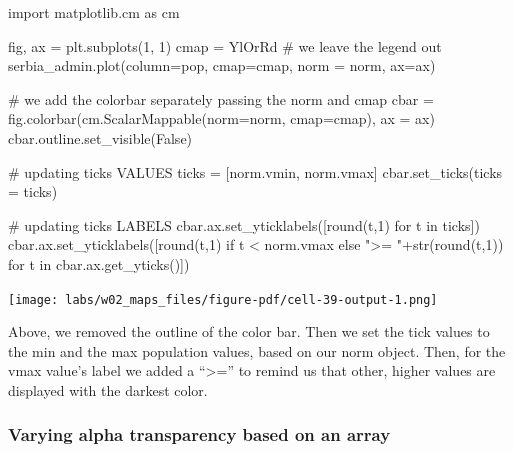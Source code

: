 \documentclass[
  letterpaper,
  DIV=11,
  numbers=noendperiod]{scrreprt}
\newenvironment{Shaded}{\begin{snugshade}}{\end{snugshade}}
\newcommand{\BuiltInTok}[1]{\textcolor[rgb]{0.00,0.23,0.31}{#1}}
\newcommand{\CommentTok}[1]{\textcolor[rgb]{0.37,0.37,0.37}{#1}}
\newcommand{\ControlFlowTok}[1]{\textcolor[rgb]{0.00,0.23,0.31}{#1}}
\newcommand{\DecValTok}[1]{\textcolor[rgb]{0.68,0.00,0.00}{#1}}
\newcommand{\ImportTok}[1]{\textcolor[rgb]{0.00,0.46,0.62}{#1}}
\newcommand{\KeywordTok}[1]{\textcolor[rgb]{0.00,0.23,0.31}{#1}}
\newcommand{\NormalTok}[1]{\textcolor[rgb]{0.00,0.23,0.31}{#1}}
\newcommand{\OperatorTok}[1]{\textcolor[rgb]{0.37,0.37,0.37}{#1}}
\newcommand{\StringTok}[1]{\textcolor[rgb]{0.13,0.47,0.30}{#1}}
\newcommand{\VariableTok}[1]{\textcolor[rgb]{0.07,0.07,0.07}{#1}}
\begin{document}
\begin{Shaded}
\begin{Highlighting}[]
\ImportTok{import}\NormalTok{ matplotlib.cm }\ImportTok{as}\NormalTok{ cm}

\NormalTok{fig, ax }\OperatorTok{=}\NormalTok{ plt.subplots(}\DecValTok{1}\NormalTok{, }\DecValTok{1}\NormalTok{)}
\NormalTok{cmap }\OperatorTok{=} \StringTok{\textquotesingle{}YlOrRd\textquotesingle{}}
\CommentTok{\# we leave the legend out}
\NormalTok{serbia\_admin.plot(column}\OperatorTok{=}\StringTok{\textquotesingle{}pop\textquotesingle{}}\NormalTok{, cmap}\OperatorTok{=}\NormalTok{cmap, norm }\OperatorTok{=}\NormalTok{ norm, ax}\OperatorTok{=}\NormalTok{ax)}

\CommentTok{\# we add the colorbar separately passing the norm and cmap}
\NormalTok{cbar }\OperatorTok{=}\NormalTok{ fig.colorbar(cm.ScalarMappable(norm}\OperatorTok{=}\NormalTok{norm, cmap}\OperatorTok{=}\NormalTok{cmap), ax }\OperatorTok{=}\NormalTok{ ax)}
\NormalTok{cbar.outline.set\_visible(}\VariableTok{False}\NormalTok{)}

\CommentTok{\# updating ticks VALUES}
\NormalTok{ticks }\OperatorTok{=}\NormalTok{ [norm.vmin, norm.vmax]}
\NormalTok{cbar.set\_ticks(ticks }\OperatorTok{=}\NormalTok{ ticks)}

\CommentTok{\# updating ticks LABELS}
\NormalTok{cbar.ax.set\_yticklabels([}\BuiltInTok{round}\NormalTok{(t,}\DecValTok{1}\NormalTok{) }\ControlFlowTok{for}\NormalTok{ t }\KeywordTok{in}\NormalTok{ ticks])}
\NormalTok{cbar.ax.set\_yticklabels([}\BuiltInTok{round}\NormalTok{(t,}\DecValTok{1}\NormalTok{) }\ControlFlowTok{if}\NormalTok{ t }\OperatorTok{\textless{}}\NormalTok{ norm.vmax }\ControlFlowTok{else} \StringTok{"\textgreater{}= "}\OperatorTok{+}\BuiltInTok{str}\NormalTok{(}\BuiltInTok{round}\NormalTok{(t,}\DecValTok{1}\NormalTok{)) }\ControlFlowTok{for}\NormalTok{ t }\KeywordTok{in}\NormalTok{ cbar.ax.get\_yticks()])}
\end{Highlighting}
\end{Shaded}

\texttt{[image: labs/w02\_maps\_files/figure-pdf/cell-39-output-1.png]}

Above, we removed the outline of the color bar. Then we set the tick
values to the min and the max population values, based on our norm
object. Then, for the vmax value's label we added a ``\textgreater='' to
remind us that other, higher values are displayed with the darkest
color.

\subsubsection{Varying alpha transparency based on an
array}\label{varying-alpha-transparency-based-on-an-array}
\end{document}
